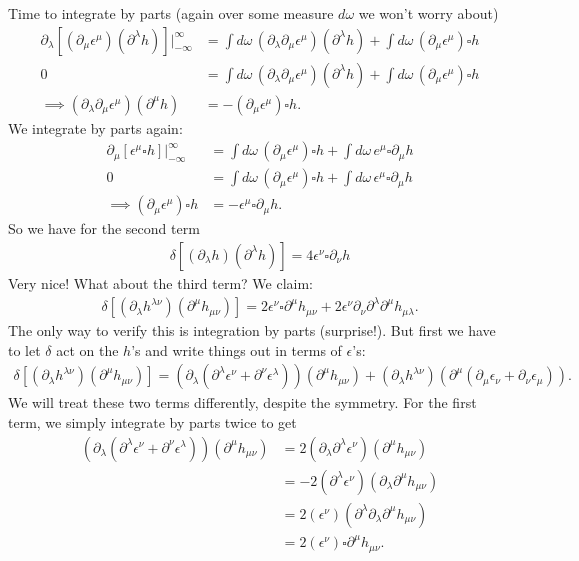 \documentclass{book}
\theoremstyle{definition}
\newcommand{\p}{\partial}
\newcommand{\nn}{\nonumber}
\begin{document}
Time to integrate by parts (again over some measure $d\omega$ we won't worry about)
\begin{align}
\p_\lambda[(\p_\mu \epsilon^\mu)(\p^\lambda h)]\bigg\vert_{-\infty}^\infty  &= \int d\omega\,(\p_\lambda \p_\mu \epsilon^\mu)(\p^\lambda h) + \int d\omega\,(\p_\mu \epsilon^\mu)\square h\nn\\
0 &= \int d\omega\,(\p_\lambda \p_\mu \epsilon^\mu)(\p^\lambda h) + \int d\omega\,(\p_\mu \epsilon^\mu)\square h\nn\\
\implies (\p_\lambda \p_\mu \epsilon^\mu)(\p^\mu h) &= -(\p_\mu \epsilon^\mu)\square h.
\end{align}
We integrate by parts again:
\begin{align}
\p_\mu[\epsilon^\mu \square h]\bigg\vert_{-\infty}^\infty &= \int d\omega\,(\p_\mu \epsilon^\mu)\square h + \int d\omega\, e^\mu \square \p_\mu h\nn\\
0 &= \int d\omega\,(\p_\mu \epsilon^\mu)\square h + \int d\omega\, \epsilon^\mu \square \p_\mu h\nn\\
\implies (\p_\mu \epsilon^\mu)\square h &=-\epsilon^\mu \square \p_\mu h.
\end{align}
So we have for the second term
\begin{align}
\boxed{\delta[(\p_\lambda h)( \p^\lambda h)] = 4\epsilon^\nu \square \p_\nu h}
\end{align}
Very nice! What about the third term? We claim:
\begin{align}
\delta[(\p_\lambda h^{\lambda \nu})( \p^\mu h_{\mu\nu})] = 2\epsilon^\nu\square\p^\mu h_{\mu\nu} + 2\epsilon^\nu \p_\nu \p^\lambda  \p^\mu h_{\mu\lambda}.
\end{align}
The only way to verify this is integration by parts (surprise!). But first we have to let $\delta$ act on the $h$'s and write things out in terms of $\epsilon$'s:
\begin{align}
\delta[(\p_\lambda h^{\lambda \nu})( \p^\mu h_{\mu\nu})] = (\p_\lambda(\p^\lambda \epsilon^\nu + \p^\nu \epsilon^\lambda))(\p^\mu h_{\mu\nu}) + (\p_\lambda h^{\lambda\nu})(\p^\mu(\p_\mu \epsilon_\nu + \p_\nu \epsilon_\mu)).
\end{align}
We will treat these two terms differently, despite the symmetry. For the first term, we simply integrate by parts twice to get
\begin{align}
(\p_\lambda(\p^\lambda \epsilon^\nu + \p^\nu \epsilon^\lambda))(\p^\mu h_{\mu\nu}) &= 2(\p_\lambda\p^\lambda \epsilon^\nu)(\p^\mu h_{\mu\nu}) \nn\\
&= -2(\p^\lambda \epsilon^\nu)(\p_\lambda\p^\mu h_{\mu\nu}) \nn\\
&= 2(\epsilon^\nu)(\p^\lambda \p_\lambda\p^\mu h_{\mu\nu})\nn\\
&= 2(\epsilon^\nu)\square\p^\mu h_{\mu\nu}.
\end{align}
\end{document}
